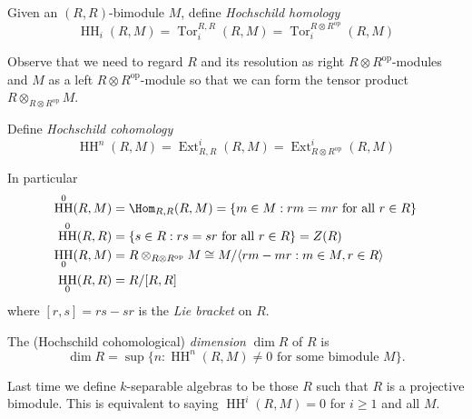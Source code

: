 \documentclass[a4paper]{article}
\DeclareMathOperator{\Tor}{Tor}
\DeclareMathOperator{\Ext}{Ext}
\newcommand{\op}{\mathrm{op}}
\DeclareMathOperator{\HH}{HH}
\begin{document}
\begin{definition}
  Given an \((R, R)\)-bimodule \(M\), define \emph{Hochschild homology}
  \[
    \HH_i(R, M) = \Tor_i^{R, R} (R, M) = \Tor_i^{R \otimes R^\op}(R, M)
  \]
\end{definition}
Observe that we need to regard \(R\) and its resolution as right \(R \otimes R^\op\)-modules and \(M\) as a left \(R \otimes R^\op\)-module so that we can form the tensor product \(R \otimes_{R \otimes R^\op} M\).

\begin{definition}
  Define \emph{Hochschild cohomology}
  \[
    \HH^n(R, M) = \Ext_{R, R}^i(R, M) = \Ext_{R \otimes R^\op}^i(R, M)
  \]
\end{definition}

In particular
\begin{align*}
  \HH^0(R, M) &= \Hom_{R, R} (R, M) = \{m \in M: rm = mr \text{ for all } r \in R\} \\
  \HH^0(R, R) &= \{s \in R: rs = sr \text{ for all } r \in R\} = Z(R) \\
  \HH_0(R, M) &= R \otimes_{R \otimes R^{\text{op}}} M \cong M / \langle rm - mr: m \in M, r \in R \rangle \\
  \HH_0(R, R) &= R/[R, R]
\end{align*}
where \([r, s] = rs - sr\) is the \emph{Lie bracket} on \(R\).

\begin{definition}
  The (Hochschild cohomological) \emph{dimension} \(\dim R\) of \(R\) is
  \[
    \dim R = \sup \{n: \HH^n(R, M) \neq 0 \text{ for some bimodule } M\}.
  \]
\end{definition}

\begin{remark}
  Last time we define \(k\)-separable algebras to be those \(R\) such that \(R\) is a projective bimodule. This is equivalent to saying \(\HH^i(R, M) = 0\) for \(i \geq 1\) and all \(M\).
\end{remark}
\end{document}
